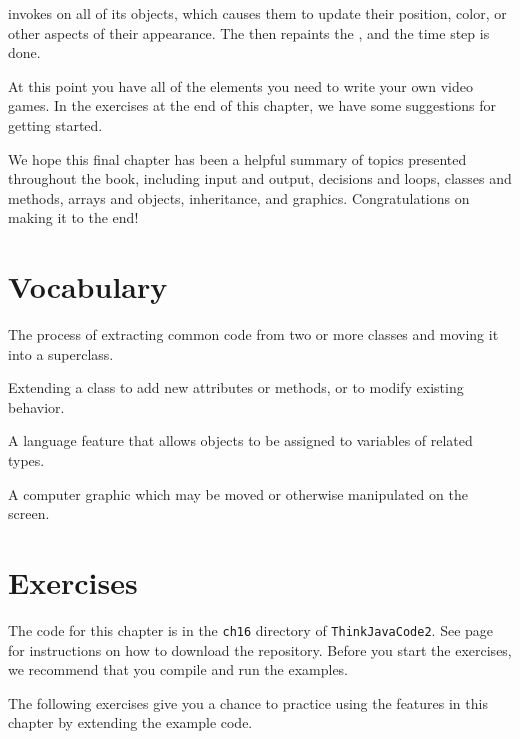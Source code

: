 invokes  on all of its  objects, which causes them to update their position, color, or other aspects of their appearance.
The  then repaints the , and the time step is done.

At this point you have all of the elements you need to write your own video games.
In the exercises at the end of this chapter, we have some suggestions for getting started.

We hope this final chapter has been a helpful summary of topics presented throughout the book, including input and output, decisions and loops, classes and methods, arrays and objects, inheritance, and graphics.
Congratulations on making it to the end!


\section{Vocabulary}

\begin{description}

The process of extracting common code from two or more classes and moving it into a superclass.

Extending a class to add new attributes or methods, or to modify existing behavior.

A language feature that allows objects to be assigned to variables of related types.

A computer graphic which may be moved or otherwise manipulated on the screen.

\end{description}


\section{Exercises}


The code for this chapter is in the {\tt ch16} directory of {\tt ThinkJavaCode2}.
See page~\pageref{code} for instructions on how to download the repository.
Before you start the exercises, we recommend that you compile and run the examples.

The following exercises give you a chance to practice using the features in this chapter by extending the example code.


